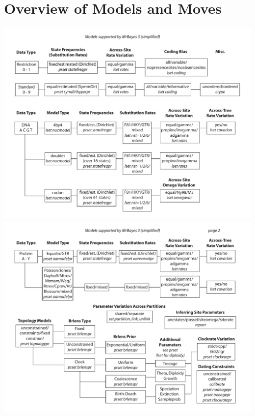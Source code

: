 \documentclass[12pt]{book}
\begin{document}
\appendix
\chapter{Overview of Models and Moves}
\label{appendixOverview}

\newpage
\includegraphics[angle=90,width=440pt]{Appendix_Fig1.pdf}
\includegraphics[angle=90,width=440pt]{Appendix_Fig2.pdf}
\end{document}
